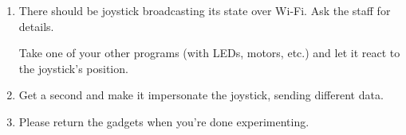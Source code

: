 \documentclass{../tutorial}
\begin{document}
\begin{enumerate}
    MicroPython establishes the connection in the background.
    Usually, you'll want to wait until `isconnected()` reports `True`.

    \begin{lstlisting}[escapeinside=<>]
    import network
    import sleep

    wlan = network.WLAN(network.STA_IF)
    wlan.active(True)
    wlan.connect('<\emph{«network name»}>', '<\emph{«password»}>')

    while not wlan.isconnected():
        print('Connecting....')
        sleep(1)

    print(wlan.ifconfig())  # Our IP address and other interface parameters
    \end{lstlisting}

\item
    There should be joystick broadcasting its state over Wi-Fi.
    Ask the staff for details.

    Take one of your other programs (with LEDs, motors, etc.)
    and let it react to the joystick's position.

\item
    Get a second  and make it impersonate the joystick,
    sending different data.

\item
    Please return the gadgets when you're done experimenting.

\end{enumerate}
\end{document}
